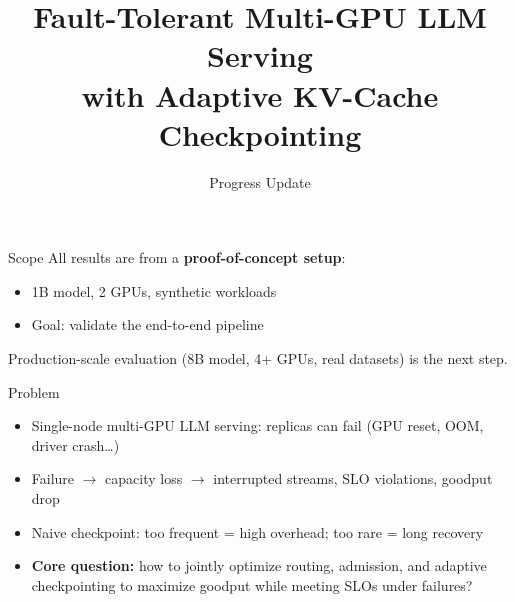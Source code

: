 \documentclass[aspectratio=169,12pt]{beamer}
\title{Fault-Tolerant Multi-GPU LLM Serving\\with Adaptive KV-Cache Checkpointing}
\subtitle{Progress Update}
\author{}
\date{}
\begin{document}
\begin{frame}
\titlepage
\end{frame}

\begin{frame}{Scope}
\centering
\vspace{2em}
{\Large All results are from a \textbf{proof-of-concept setup}:}
\vspace{1em}

\begin{itemize}
    \setlength\itemsep{0.8em}
    \item 1B model, 2 GPUs, synthetic workloads
    \item Goal: validate the end-to-end pipeline
\end{itemize}

\vspace{1.5em}
{\large Production-scale evaluation (8B model, 4+ GPUs, real datasets) is the next step.}
\end{frame}

\begin{frame}{Problem}
\begin{itemize}
    \setlength\itemsep{0.8em}
    \item Single-node multi-GPU LLM serving: replicas can fail (GPU reset, OOM, driver crash\ldots)
    \item Failure $\rightarrow$ capacity loss $\rightarrow$ interrupted streams, SLO violations, goodput drop
    \item Naive checkpoint: too frequent = high overhead; too rare = long recovery
    \item \textbf{Core question:} how to jointly optimize \textcolor{myblue}{routing}, \textcolor{myblue}{admission}, and \textcolor{myblue}{adaptive checkpointing} to maximize goodput while meeting SLOs under failures?
\end{itemize}
\end{frame}
\end{document}
